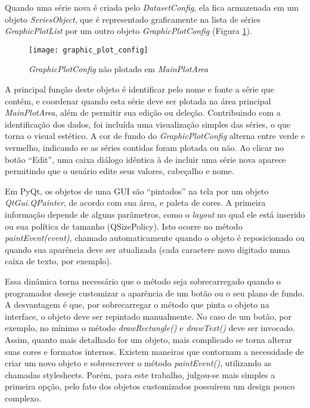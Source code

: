 Quando uma série nova é criada pelo \emph{DatasetConfig}, ela fica armazenada em um objeto \emph{SeriesObject}, que é representado graficamente na lista de séries \emph{GraphicPlotList} por um outro objeto \emph{GraphicPlotConfig} (Figura \ref{img_graphic_plot_config}).

\begin{figure}[hbt]
	\centering
	\caption{\emph{GraphicPlotConfig} não plotado em \emph{MainPlotArea}}
	\texttt{[image: graphic\_plot\_config]}
	\label{img_graphic_plot_config}
\end{figure}

A principal função deste objeto é identificar pelo nome e fonte a série que contém, e coordenar quando esta série deve ser plotada na área principal \emph{MainPlotArea}, além de permitir sua edição ou deleção. Contribuindo com a identificação dos dados, foi incluída uma visualização simples das séries, o que torna o visual estético. A cor de fundo do \emph{GraphicPlotConfig} alterna entre verde e vermelho, indicando se as séries contidas foram plotada ou não. Ao clicar no botão “Edit”, uma caixa diálogo idêntica à de incluir uma série nova aparece permitindo que o usuário edite seus valores, cabeçalho e nome.

Em PyQt, os objetos de uma GUI são “pintados” na tela por um objeto \emph{QtGui.QPainter}, de acordo com sua área, e paleta de cores. A primeira informação depende de alguns parâmetros, como o \textit{layout} no qual ele está inserido ou sua política de tamanho (QSizePolicy). Isto ocorre no método \emph{paintEvent(event)}, chamado automaticamente quando o objeto é reposicionado ou quando sua aparência deve ser atualizada (cada caractere novo digitado numa caixa de texto, por exemplo).

Essa dinâmica torna necessário que o método seja sobrecarregado quando o programador deseje customizar a aparência de um botão ou o seu plano de fundo. A desvantagem é que, por sobrecarregar o método que pinta o objeto na interface, o objeto deve ser repintado manualmente. No caso de um botão, por exemplo, no mínimo o método \emph{drawRectangle()} e \emph{drawText()} deve ser invocado. Assim, quanto mais detalhado for um objeto, mais complicado se torna alterar suas cores e formatos internos. Existem maneiras que contornam a necessidade de criar um novo objeto e sobrescrever o método \emph{paintEvent()}, utilizando as chamadas stylesheets. Porém, para este trabalho, julgou-se mais simples a primeira opção, pelo fato dos objetos customizados possuírem um design pouco complexo.

